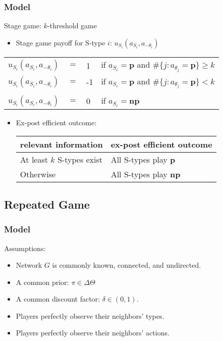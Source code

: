 \documentclass[9pt]{beamer}
\begin{document}
\begin{frame}[label=static_game]
  \frametitle{Model}
Stage game: $k$-threshold game

  \begin{itemize}

  \item Stage game payoff for S-type $i$: $u_{S_i}(a_{S_i},a_{-\theta_i})$

\end{itemize}
  \begin{table}[h]
\begin{tabular}{llll}
$u_{S_i}(a_{S_i},a_{-\theta_i})$ & $=$ & 1 & if $a_{S_i}=\textbf{p}$ and $\#\{j:a_{\theta_j}=\textbf{p}\}\geq k$ \\
$u_{S_i}(a_{S_i},a_{-\theta_i})$ & $=$ & -1 & if $a_{S_i}=\textbf{p}$ and $\#\{j:a_{\theta_j}=\textbf{p}\}< k$ \\
\\
$u_{S_i}(a_{S_i},a_{-\theta_i})$ & $=$ & 0 & if $a_{S_i}=\textbf{np}$ \pause \\
\end{tabular}

\end{table}


 \begin{itemize}
 \item Ex-post efficient outcome: 
 \begin{table}[h]
\begin{tabular}{ll}
relevant information & ex-post efficient outcome \\
\hline
At least $k$ S-types exist & All S-types play \textbf{p}  \\
Otherwise &  All S-types play \textbf{np} 
\end{tabular}
\end{table}

 \end{itemize}

\end{frame}







\subsection{Repeated Game}


\begin{frame}
  \frametitle{Model}

Assumptions:
\begin{itemize}
\item Network $G$ is \alert{commonly known}, \alert{connected}, and \alert{undirected}.
\item A common prior: $\pi\in \Delta \Theta$
\item A common discount factor: $\delta\in (0,1)$.
\item Players perfectly observe their neighbors' types.
\item Players perfectly observe their neighbors' actions. 
\end{itemize}


\end{frame}
\end{document}

